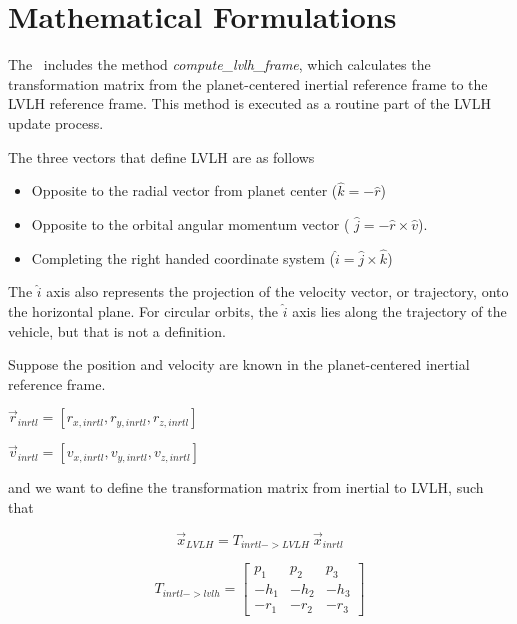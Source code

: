 %
%
% 
%

\section{Mathematical Formulations}
\label{sec:Lvlhmath}

The \LVLHDesc\ includes the method \textit{compute\_lvlh\_frame}, which calculates the transformation matrix from the planet-centered inertial reference frame to the LVLH reference frame.  This method is executed as a routine part of the LVLH update process.

The three vectors that define LVLH are as follows
\begin{itemize}
 \item Opposite to the radial vector from planet center ($\hat k = -\hat r$)
  \item Opposite to the orbital angular momentum vector ( $\hat j = -\hat r
  \times \hat v$).
  \item Completing the right handed coordinate system ($\hat i = \hat j \times \hat k$)
\end{itemize}

The $\hat i$ axis also represents the projection of the velocity vector, or trajectory, onto the horizontal plane.  For circular orbits, the $\hat i$ axis lies along the trajectory of the vehicle, but that is not a definition.

Suppose the position and velocity are known in the planet-centered inertial reference frame.

$\vec r_{inrtl} = [r_{x,inrtl} , r_{y,inrtl} , r_{z,inrtl}]$

$\vec v_{inrtl} = [v_{x,inrtl} , v_{y,inrtl} , v_{z,inrtl}]$

and we want to define the transformation matrix from inertial to LVLH, such that

\begin{equation*}
 \vec x_{LVLH} = T_{inrtl->LVLH} ~ \vec x_{inrtl}
\end{equation*}

\begin{equation*} 
 T_{inrtl->lvlh} = \begin{bmatrix} p_1 & p_2 & p_3 \\ -h_1 & -h_2 & -h_3 \\ -r_1 & -r_2 & -r_3 \end{bmatrix}
\end{equation*}

